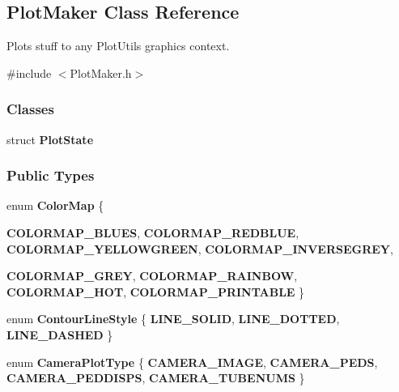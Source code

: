 \hypertarget{classPlotMaker}{
\subsection{PlotMaker Class Reference}
\label{classPlotMaker}
}


Plots stuff to any PlotUtils graphics context.  




{\ttfamily \#include $<$PlotMaker.h$>$}

\subsubsection*{Classes}
\begin{DoxyCompactItemize}
\item 
struct {\bfseries PlotState}
\end{DoxyCompactItemize}
\subsubsection*{Public Types}
\begin{DoxyCompactItemize}
\item 
enum {\bfseries ColorMap} \{ \par
{\bfseries COLORMAP\_\-BLUES}, 
{\bfseries COLORMAP\_\-REDBLUE}, 
{\bfseries COLORMAP\_\-YELLOWGREEN}, 
{\bfseries COLORMAP\_\-INVERSEGREY}, 
\par
{\bfseries COLORMAP\_\-GREY}, 
{\bfseries COLORMAP\_\-RAINBOW}, 
{\bfseries COLORMAP\_\-HOT}, 
{\bfseries COLORMAP\_\-PRINTABLE}
 \}
\item 
enum {\bfseries ContourLineStyle} \{ {\bfseries LINE\_\-SOLID}, 
{\bfseries LINE\_\-DOTTED}, 
{\bfseries LINE\_\-DASHED}
 \}
\item 
enum {\bfseries CameraPlotType} \{ {\bfseries CAMERA\_\-IMAGE}, 
{\bfseries CAMERA\_\-PEDS}, 
{\bfseries CAMERA\_\-PEDDISPS}, 
{\bfseries CAMERA\_\-TUBENUMS}
 \}
\end{DoxyCompactItemize}
